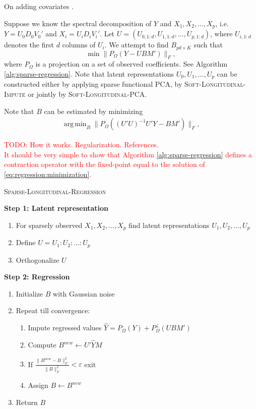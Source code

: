 \documentclass[preprint]{imsart}
\numberwithin{equation}{section}
\theoremstyle{plain}
\newcommand{\tr}[1]{{\textcolor{red}{#1}}}
\DeclareMathOperator*{\argmin}{arg\,min}
\begin{document}
On adding covariates \cite{condli1999bayesian}.

Suppose we know the spectral decomposition of $Y$ and $X_1, X_2, ..., X_p$, i.e. $Y = U_0 D_0 V_0'$ and $X_i = U_i D_i V_i'$.
Let $U = (U_{0,1:d},U_{1,1:d},...,U_{p,1:d})$, where $U_{i,1:d}$ denotes the first $d$ columns of $U_i$. We attempt to find $B_{pd \times K}$ such that
\[
\min \|P_\Omega(Y - UBM')\|_F,
\]
where $P_\Omega$ is a projection on a set of observed coefficients. See Algorithm \ref{alg:sparse-regression}. Note that latent representations $U_0,U_1,...,U_p$ can be constructed either by applying sparse functional PCA, by \textsc{Soft-Longitudinal-Impute} or jointly by \textsc{Soft-Longitudinal-PCA}.

Note that $B$ can be estimated by minimizing 
\begin{align}\label{eq:regression:minimization}
\argmin_B \|P_\Omega((U'U)^{-1}U'Y - BM')\|_F,
\end{align}


\tr{TODO: How it works. Regularization. References.\\
It should be very simple to show that Algorithm \ref{alg:sparse-regression} defines a contraction operator with the fixed-point equal to the solution of \eqref{eq:regression:minimization}. \citep{bertsekas1999nonlinear}
}


\begin{algorithm}
\caption{\textsc{Sparse-Longitudinal-Regression}\label{alg:sparse-regression}}
\vspace{3pt}
\begin{flushleft}
\textbf{Step 1: Latent representation}
\end{flushleft}
\begin{enumerate}
\item For sparsely observed $X_1,X_2,...,X_p$ find latent representations $U_1,U_2,...,U_p$
\item Define $U = U_1:U_2:...:U_p$
\item Orthogonalize $U$
\end{enumerate}
\begin{flushleft}
\textbf{Step 2: Regression}
\end{flushleft}
\begin{enumerate}
\item Initialize $B$ with Gaussian noise
\item Repeat till convergence:
\begin{enumerate}
\item Impute regressed values $\hat{Y} = P_\Omega(Y) + P_\Omega^\perp(UBM')$
\item Compute $B^{new} \leftarrow U'\hat{Y}M$
\item If $\frac{\|B^{new} - B\|_F^2}{\|B\|_F^2} < \varepsilon$ exit
\item Assign $B \leftarrow B^{new}$
\end{enumerate}
\item Return $B$
\end{enumerate}
\end{algorithm}
\end{document}
